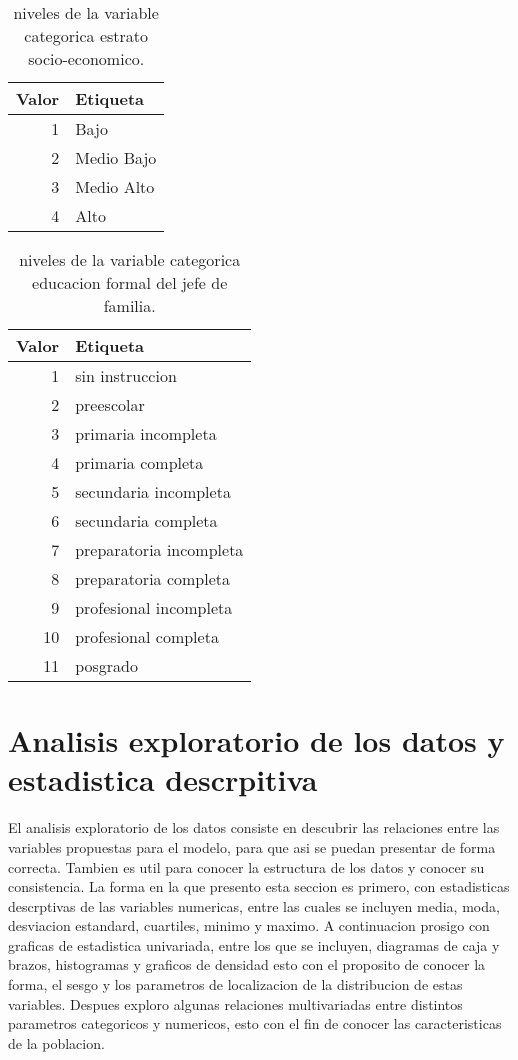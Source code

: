 \documentclass[]{book}
\begin{document}
\begin{table}

\caption{\label{tab:unnamed-chunk-8} niveles de la variable categorica estrato socio-economico.}
\centering
\begin{tabular}[t]{r|l}
\hline
Valor & Etiqueta\\
\hline
1 & Bajo\\
\hline
2 & Medio Bajo\\
\hline
3 & Medio Alto\\
\hline
4 & Alto\\
\hline
\end{tabular}
\end{table}

\begin{table}

\caption{\label{tab:unnamed-chunk-8} niveles de la variable categorica educacion formal del jefe de familia.}
\centering
\begin{tabular}[t]{r|l}
\hline
Valor & Etiqueta\\
\hline
1 & sin instruccion\\
\hline
2 & preescolar\\
\hline
3 & primaria incompleta\\
\hline
4 & primaria completa\\
\hline
5 & secundaria incompleta\\
\hline
6 & secundaria completa\\
\hline
7 & preparatoria incompleta\\
\hline
8 & preparatoria completa\\
\hline
9 & profesional incompleta\\
\hline
10 & profesional completa\\
\hline
11 & posgrado\\
\hline
\end{tabular}
\end{table}

\chapter{Analisis exploratorio de los datos y estadistica
descrpitiva}\label{analisis-exploratorio-de-los-datos-y-estadistica-descrpitiva}

El analisis exploratorio de los datos consiste en descubrir las
relaciones entre las variables propuestas para el modelo, para que asi
se puedan presentar de forma correcta. Tambien es util para conocer la
estructura de los datos y conocer su consistencia. La forma en la que
presento esta seccion es primero, con estadisticas descrptivas de las
variables numericas, entre las cuales se incluyen media, moda,
desviacion estandard, cuartiles, minimo y maximo. A continuacion prosigo
con graficas de estadistica univariada, entre los que se incluyen,
diagramas de caja y brazos, histogramas y graficos de densidad esto con
el proposito de conocer la forma, el sesgo y los parametros de
localizacion de la distribucion de estas variables. Despues exploro
algunas relaciones multivariadas entre distintos parametros categoricos
y numericos, esto con el fin de conocer las caracteristicas de la
poblacion.
\end{document}
